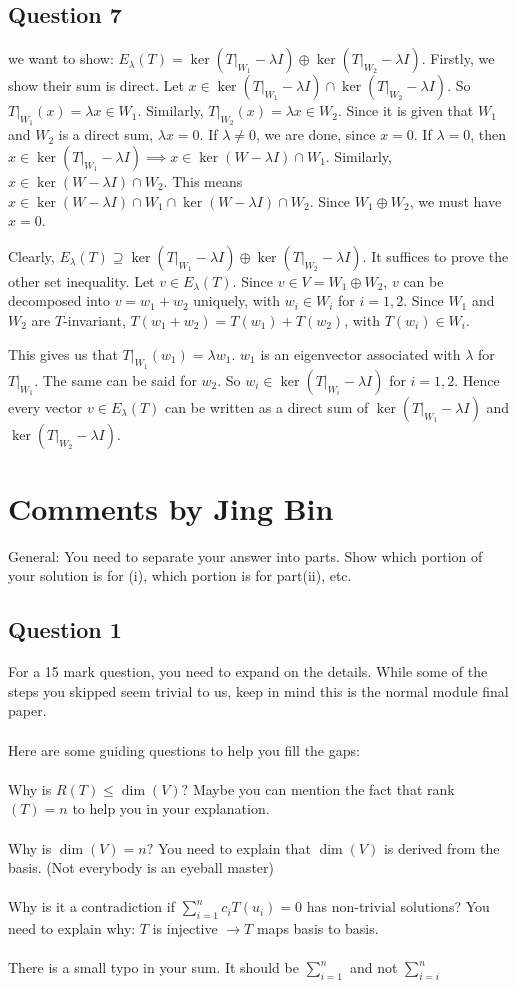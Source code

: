 \documentclass{article}
\begin{document}
\subsection*{Question 7}
we want to show: $E_{\lambda}(T) = \ker (T|_{W_1}- \lambda I) \oplus \ker(T|_{W_2} -\lambda I)$. Firstly, we show their sum is direct. Let $x \in \ker (T|_{W_1}- \lambda I) \cap \ker(T|_{W_2} -\lambda I)$. So $T|_{W_1}(x) = \lambda x \in W_1$. Similarly, $T|_{W_2}(x) = \lambda x \in W_2$. Since it is given that $W_1$ and $W_2$ is a direct sum, $\lambda x =0$. If $\lambda \neq 0$, we are done, since $x=0$. If $\lambda =0$, then $x \in \ker (T|_{W_1}- \lambda I) \implies x \in \ker (W - \lambda I) \cap W_1$. Similarly, $x \in \ker (W - \lambda I) \cap W_2$. This means $x \in \ker (W - \lambda I) \cap W_1 \cap \ker (W - \lambda I) \cap W_2$. Since $W_1 \oplus W_2$, we must have $x=0$.

Clearly, $E_{\lambda}(T) \supseteq \ker (T|_{W_1}- \lambda I) \oplus \ker(T|_{W_2} -\lambda I)$. It suffices to prove the other set inequality. Let $v \in E_{\lambda}(T)$. Since $v \in V = W_1 \oplus W_2$, $v$ can be decomposed into $v=w_1+w_2$ uniquely, with $w_i \in W_i$ for $i=1,2$. Since $W_1$ and $W_2$ are $T$-invariant, $T(w_1+w_2)=T(w_1)+T(w_2)$, with $T(w_i) \in W_i$. 


This gives us that $T|_{W_1}(w_1)=\lambda w_1$. $w_1$ is an eigenvector associated with $\lambda$ for $T|_{W_1}$. The same can be said for $w_2$. So $w_i \in \ker(T|_{W_i}-\lambda I)$ for $i=1,2$. Hence every vector $v \in E_{\lambda}(T)$ can be written as a direct sum of $\ker(T|_{W_1}-\lambda I)$ and $\ker(T|_{W_2}-\lambda I)$.

\section*{Comments by Jing Bin}
General: You need to separate your answer into parts. Show which portion of your solution is for (i), which portion is for part(ii), etc.
\subsection*{Question 1} For a 15 mark question, you need to expand on the details. While some of the steps you skipped seem trivial to us, keep in mind this is the normal module final paper.\\\\
Here are some guiding questions to help you fill the gaps:\\\\ Why is $R(T) \leq \dim(V)?$ Maybe you can mention the fact that rank$(T) = n$ to help you in your explanation.\\\\ Why is $\dim(V) = n?$ You need to explain that $\dim(V)$ is derived from the basis. (Not everybody is an eyeball master)\\\\ Why is it a contradiction if $\sum^n_{i = 1} c_iT(u_i) = 0$ has non-trivial solutions? You need to explain why: $T$ is injective $\to T$ maps basis to basis.\\\\
There is a small typo in your sum. It should be $\sum^n_{i=1}$ and not $\sum^n_{i=i}$
\end{document}

